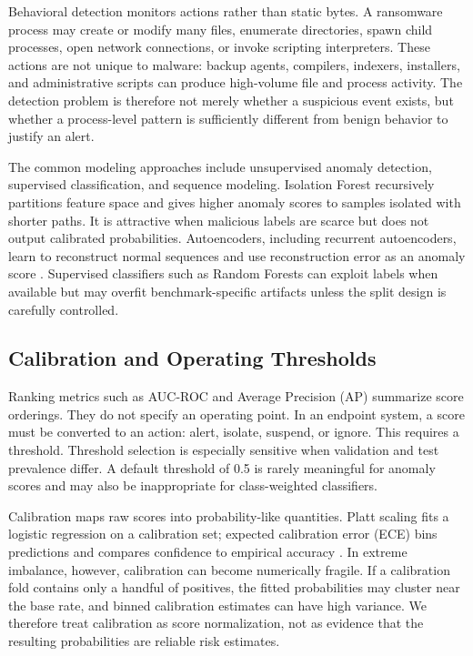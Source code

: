\documentclass[10pt,journal,compsoc]{IEEEtran}
\begin{document}
Behavioral detection monitors actions rather than static bytes. A ransomware process may create or modify many files, enumerate directories, spawn child processes, open network connections, or invoke scripting interpreters. These actions are not unique to malware: backup agents, compilers, indexers, installers, and administrative scripts can produce high-volume file and process activity. The detection problem is therefore not merely whether a suspicious event exists, but whether a process-level pattern is sufficiently different from benign behavior to justify an alert.

The common modeling approaches include unsupervised anomaly detection, supervised classification, and sequence modeling. Isolation Forest \cite{liu2008} recursively partitions feature space and gives higher anomaly scores to samples isolated with shorter paths. It is attractive when malicious labels are scarce but does not output calibrated probabilities. Autoencoders, including recurrent autoencoders, learn to reconstruct normal sequences and use reconstruction error as an anomaly score \cite{cho2014,du2017}. Supervised classifiers such as Random Forests \cite{breiman2001} can exploit labels when available but may overfit benchmark-specific artifacts unless the split design is carefully controlled.

\subsection{Calibration and Operating Thresholds}

Ranking metrics such as AUC-ROC and Average Precision (AP) summarize score orderings. They do not specify an operating point. In an endpoint system, a score must be converted to an action: alert, isolate, suspend, or ignore. This requires a threshold. Threshold selection is especially sensitive when validation and test prevalence differ. A default threshold of 0.5 is rarely meaningful for anomaly scores and may also be inappropriate for class-weighted classifiers.

Calibration maps raw scores into probability-like quantities. Platt scaling \cite{platt1999} fits a logistic regression on a calibration set; expected calibration error (ECE) bins predictions and compares confidence to empirical accuracy \cite{guo2017}. In extreme imbalance, however, calibration can become numerically fragile. If a calibration fold contains only a handful of positives, the fitted probabilities may cluster near the base rate, and binned calibration estimates can have high variance. We therefore treat calibration as score normalization, not as evidence that the resulting probabilities are reliable risk estimates.
\end{document}
